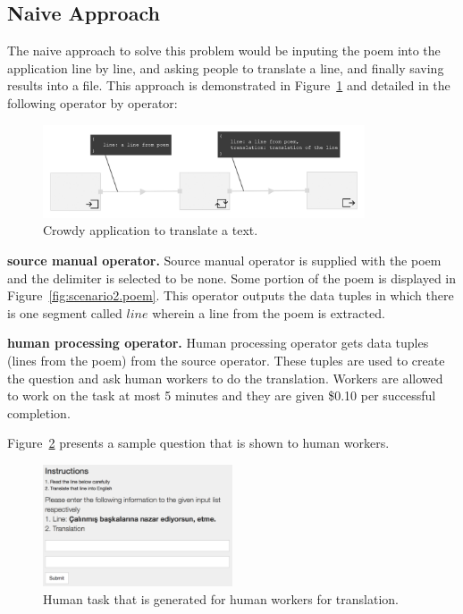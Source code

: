 \subsection{Naive Approach}
The naive approach to solve this problem would be inputing the poem into the application line by line, and asking people to translate a line, and finally saving results into a file. This approach is demonstrated in Figure~\ref{fig:scenario2} and detailed in the following operator by operator:

\begin{figure}[ht]
	\centering
	\includegraphics[width=0.85\textwidth]{figures/scenarios/scenario2_1a.png}
	\caption{Crowdy application to translate a text.}
	\label{fig:scenario2}
\end{figure}

\textbf{source manual operator.}
Source manual operator is supplied with the poem and the delimiter is selected to be none. Some portion of the poem is displayed in Figure~\ref{fig:scenario2.poem}. This operator outputs the data tuples in which there is one segment called $line$ wherein a line from the poem is extracted.


\textbf{human processing operator.}
Human processing operator gets data tuples (lines from the poem) from the source operator. These tuples are used to create the question and ask human workers to do the translation. Workers are allowed to work on the task at most 5 minutes and they are given \$0.10 per successful completion.

Figure~\ref{fig:scenario2.1h} presents a sample question that is shown to human workers.

\begin{figure}[ht]
	\centering
	\includegraphics[width=0.5\textwidth]{figures/scenarios/scenario2_1h.png}
	\caption{Human task that is generated for human workers for translation.}
	\label{fig:scenario2.1h}
\end{figure}

